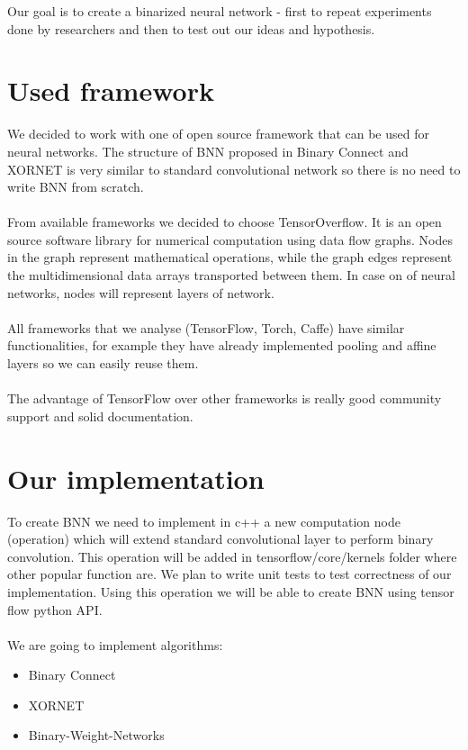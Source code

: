 \documentclass[licencjacka]{pracamgr}
\begin{document}
	Our goal is to create a binarized neural network - first to repeat experiments done by researchers and then to test out our ideas and hypothesis. 

	\section{Used framework}

		We decided to work with one of open source framework that can be used for neural networks. The structure of BNN proposed in Binary Connect \cite{binaryConnect} and XORNET \cite{xornet} is very similar to standard convolutional network so there is no need to write BNN from scratch. 
		\\\\
		From available frameworks we decided to choose TensorOverflow. It is an open source software library for numerical computation using data flow graphs. Nodes in the graph represent mathematical operations, while the graph edges represent the multidimensional data arrays transported between them. In case on of neural networks, nodes will represent layers of network. 
		\\\\
		All frameworks that we analyse (TensorFlow, Torch, Caffe) have similar functionalities, for example they have already implemented pooling and affine layers so we can easily reuse them.
		\\\\
		The advantage of TensorFlow over other frameworks is really good community support and solid documentation.

	\section{Our implementation}

		To create BNN we need to implement in c++ a new computation node (operation) which will extend standard convolutional layer to perform binary convolution. This operation will be added in tensorflow/core/kernels folder where other popular function are. We plan to write unit tests to test correctness of our implementation. Using this operation we will be able to create BNN using tensor flow python API.
		\\\\
		We are going to implement algorithms:
		\begin{itemize}
		\item Binary Connect \cite{binaryConnect}
		\item XORNET \cite{xornet}
		\item Binary-Weight-Networks \cite{xornet}
		\end{itemize}
\end{document}
